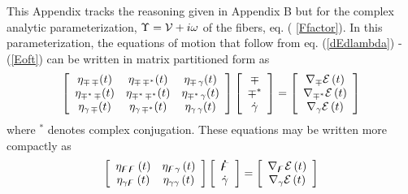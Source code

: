 This Appendix tracks the reasoning given in Appendix B but for the complex
analytic parameterization, $\Upsilon ={\cal V}+i\omega $ of the fibers, eq. (%
\ref{Ffactor}). In this parameterization, the equations of motion that
follow from eq. (\ref{dEdlambda}) - (\ref{Eoft}) can be written in matrix
partitioned form as 
\begin{equation}
\left[ 
\begin{array}{ccc}
\eta _{{\cal \Upsilon }\,{\cal \Upsilon }}(t) & \eta _{{\cal \Upsilon }\,%
{\cal \Upsilon }^{\ast }}(t) & \eta _{{\cal \Upsilon }\,\gamma }(t) \\ 
\eta _{{\cal \Upsilon }^{\ast }\,{\cal \Upsilon }}(t) & \eta _{{\cal %
\Upsilon }^{\ast }\,{\cal \Upsilon }^{\ast }}(t) & \eta _{{\cal \Upsilon }%
^{\ast }\,\gamma }(t) \\ 
\eta _{\gamma \,{\cal \Upsilon }}(t) & \eta _{\gamma \,{\cal \Upsilon }%
^{\ast }}(t) & \eta _{\gamma \,\gamma }(t)%
\end{array}%
\right] \left[ 
\begin{array}{c}
{\cal \Upsilon } \\ 
{\cal \Upsilon }^{\ast } \\ 
\dot{\gamma}%
\end{array}%
\right] =\left[ 
\begin{array}{c}
\nabla _{{\cal \Upsilon }}{\cal E}\left( t\right) \\ 
\nabla _{{\cal \Upsilon }^{\ast }}{\cal E}\left( t\right) \\ 
\nabla _{\gamma }{\cal E}\left( t\right)%
\end{array}%
\right]  \label{3x3partmat}
\end{equation}%
where $^{\ast }$ denotes complex conjugation. These equations may be written
more compactly as 
\begin{equation}
\left[ 
\begin{array}{cc}
\eta _{{\bf \digamma \digamma }}\left( t\right) & \eta _{{\bf \digamma }%
\gamma }\left( t\right) \\ 
\eta _{\gamma {\bf \digamma }}\left( t\right) & \eta _{\gamma \gamma }\left(
t\right)%
\end{array}%
\right] \left[ 
\begin{array}{c}
{\bf \dot{\digamma}} \\ 
\dot{\gamma}%
\end{array}%
\right] =\left[ 
\begin{array}{c}
\nabla _{{\bf \digamma }}{\cal E}\left( t\right) \\ 
\nabla _{\gamma }{\cal E}\left( t\right)%
\end{array}%
\right]  \label{partmat2}
\end{equation}%
